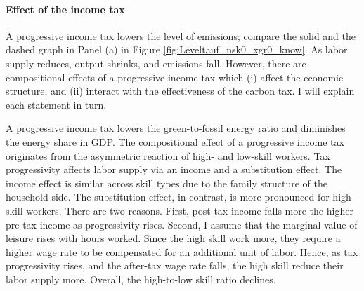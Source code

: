 \paragraph{Effect of the income tax}

 A progressive income tax lowers the level of emissions; compare the solid and the dashed graph in Panel (a) in Figure \ref{fig:Leveltauf_nsk0_xgr0_know}. As labor supply reduces, output shrinks, and emissions fall. 
 However, there are compositional effects of a progressive income tax which (i) affect the economic structure, and (ii) interact with the effectiveness of the carbon tax. I will explain each statement in turn. 
 
 A progressive income tax lowers the green-to-fossil energy ratio and diminishes the energy share in GDP. %
 The compositional effect of a progressive income tax originates from the asymmetric reaction of high- and low-skill workers. 
  Tax progressivity affects labor supply via an income and a substitution effect. 
 The income effect is similar across skill types due to the family structure of the household side.
 The substitution effect, in contrast, is more pronounced for high-skill workers.
 There are two reasons. First, post-tax income falls more the higher pre-tax income as progressivity rises. 
 Second,  I assume that the marginal value of leisure rises with hours worked. Since the high skill work more, they require a higher wage rate to be compensated for an additional unit of labor. Hence, as tax progressivity rises, and the after-tax wage rate falls, the high skill reduce their labor supply more.  %
 Overall, the high-to-low skill ratio declines. 
 
